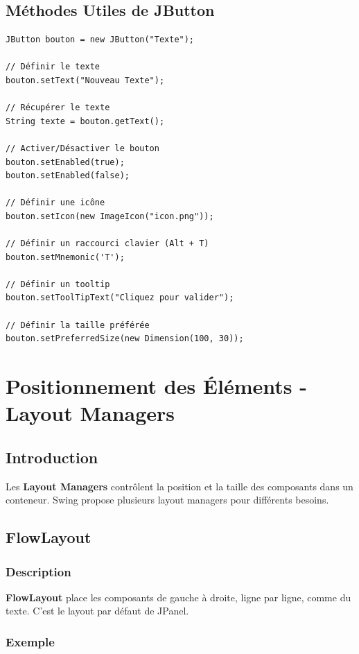 \documentclass[11pt,a4paper]{article}
\begin{document}
\subsection{Méthodes Utiles de JButton}

\begin{lstlisting}
JButton bouton = new JButton("Texte");

// Définir le texte
bouton.setText("Nouveau Texte");

// Récupérer le texte
String texte = bouton.getText();

// Activer/Désactiver le bouton
bouton.setEnabled(true);
bouton.setEnabled(false);

// Définir une icône
bouton.setIcon(new ImageIcon("icon.png"));

// Définir un raccourci clavier (Alt + T)
bouton.setMnemonic('T');

// Définir un tooltip
bouton.setToolTipText("Cliquez pour valider");

// Définir la taille préférée
bouton.setPreferredSize(new Dimension(100, 30));
\end{lstlisting}

\newpage

\section{Positionnement des Éléments - Layout Managers}

\subsection{Introduction}

Les \textbf{Layout Managers} contrôlent la position et la taille des composants dans un conteneur. Swing propose plusieurs layout managers pour différents besoins.

\subsection{FlowLayout}

\subsubsection{Description}

\textbf{FlowLayout} place les composants de gauche à droite, ligne par ligne, comme du texte. C'est le layout par défaut de JPanel.

\subsubsection{Exemple}
\end{document}
